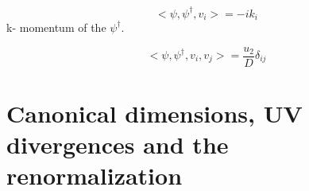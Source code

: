 \documentclass[12pt]{article}
\begin{document}
\begin{equation}
    <\psi, \psi^{\dagger}, v_{i}>= -ik_{i}
\end{equation}
k- momentum of the $\psi^{\dagger}$.

\begin{equation}
    <\psi, \psi^{\dagger}, v_{i}, v_{j}>= \frac{u_{2}}{D}\delta_{ij}
\end{equation}

\section{Canonical dimensions, UV divergences and the renormalization}
\label{sec:Reno}

\end{document}
